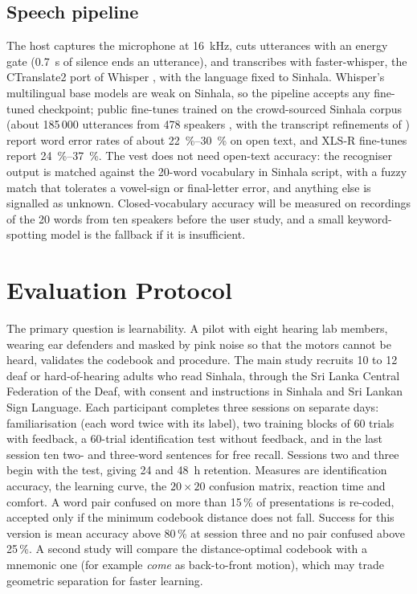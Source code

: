 \documentclass[conference]{IEEEtran}
\begin{document}
\subsection{Speech pipeline}
The host captures the microphone at \SI{16}{kHz}, cuts utterances with an energy gate (\SI{0.7}{s} of silence ends an utterance), and transcribes with faster-whisper, the CTranslate2 port of Whisper \cite{radford2023}, with the language fixed to Sinhala. Whisper's multilingual base models are weak on Sinhala, so the pipeline accepts any fine-tuned checkpoint; public fine-tunes trained on the crowd-sourced Sinhala corpus (about 185\,000 utterances from 478 speakers \cite{kjartansson2018}, with the transcript refinements of \cite{warusawithana2022}) report word error rates of about \SIrange{22}{30}{\percent} on open text, and XLS-R fine-tunes \cite{babu2022} report \SIrange{24}{37}{\percent}. The vest does not need open-text accuracy: the recogniser output is matched against the 20-word vocabulary in Sinhala script, with a fuzzy match that tolerates a vowel-sign or final-letter error, and anything else is signalled as unknown. Closed-vocabulary accuracy will be measured on recordings of the 20 words from ten speakers before the user study, and a small keyword-spotting model is the fallback if it is insufficient.

\section{Evaluation Protocol}
The primary question is learnability. A pilot with eight hearing lab members, wearing ear defenders and masked by pink noise so that the motors cannot be heard, validates the codebook and procedure. The main study recruits 10 to 12 deaf or hard-of-hearing adults who read Sinhala, through the Sri Lanka Central Federation of the Deaf, with consent and instructions in Sinhala and Sri Lankan Sign Language. Each participant completes three sessions on separate days: familiarisation (each word twice with its label), two training blocks of 60 trials with feedback, a 60-trial identification test without feedback, and in the last session ten two- and three-word sentences for free recall. Sessions two and three begin with the test, giving 24 and \SI{48}{h} retention. Measures are identification accuracy, the learning curve, the $20\times20$ confusion matrix, reaction time and comfort. A word pair confused on more than 15\,\% of presentations is re-coded, accepted only if the minimum codebook distance does not fall. Success for this version is mean accuracy above 80\,\% at session three and no pair confused above 25\,\%. A second study will compare the distance-optimal codebook with a mnemonic one (for example \emph{come} as back-to-front motion), which may trade geometric separation for faster learning.
\end{document}
